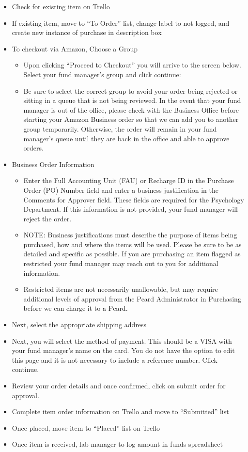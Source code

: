 \documentclass[
]{book}
\providecommand{\tightlist}{%
  \setlength{\itemsep}{0pt}\setlength{\parskip}{0pt}}
\begin{document}
\begin{itemize}
\tightlist
\item
  Check for existing item on Trello
\item
  If existing item, move to ``To Order'' list, change label to not logged, and create new instance of purchase in description box
\item
  To checkout via Amazon, Choose a Group

  \begin{itemize}
  \tightlist
  \item
    Upon clicking ``Proceed to Checkout'' you will arrive to the screen below. Select your fund manager's group and click continue:
  \item
    Be sure to select the correct group to avoid your order being rejected or sitting in a queue that is not being reviewed. In the event that your fund manager is out of the office, please check with the Business Office before starting your Amazon Business order so that we can add you to another group temporarily. Otherwise, the order will remain in your fund manager's queue until they are back in the office and able to approve orders.
  \end{itemize}
\item
  Business Order Information

  \begin{itemize}
  \tightlist
  \item
    Enter the Full Accounting Unit (FAU) or Recharge ID in the Purchase Order (PO) Number field and enter a business justification in the Comments for Approver field. These fields are required for the Psychology Department. If this information is not provided, your fund manager will reject the order.
  \item
    NOTE: Business justifications must describe the purpose of items being purchased, how and where the items will be used. Please be sure to be as detailed and specific as possible. If you are purchasing an item flagged as restricted your fund manager may reach out to you for additional information.\\
  \item
    Restricted items are not necessarily unallowable, but may require additional levels of approval from the Pcard Administrator in Purchasing before we can charge it to a Pcard.
  \end{itemize}
\item
  Next, select the appropriate shipping address
\item
  Next, you will select the method of payment. This should be a VISA with your fund manager's name on the card. You do not have the option to edit this page and it is not necessary to include a reference number. Click continue.
\item
  Review your order details and once confirmed, click on submit order for approval.
\item
  Complete item order information on Trello and move to ``Submitted'' list
\item
  Once placed, move item to ``Placed'' list on Trello
\item
  Once item is received, lab manager to log amount in funds spreadsheet


\end{itemize}
\end{document}
